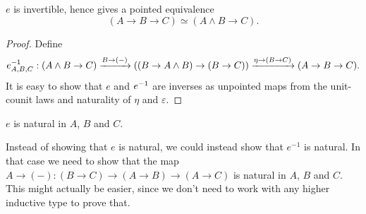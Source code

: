 \documentclass{article}
\newcommand{\pmap}{\to}
\newcommand{\lpmap}{\xrightarrow}
\renewcommand{\smash}{\wedge}
\renewcommand{\epsilon}{\varepsilon}
\renewcommand{\o}{\ensuremath{\circ}}
\begin{document}
\begin{lem}
  $e$ is invertible, hence gives a pointed equivalence $$(A\pmap B\pmap C)\simeq(A\smash B\pmap C).$$
\end{lem}
\begin{proof}
  Define
  $$\inv{e}_{A,B,C}:(A\smash B\pmap C)\lpmap{B\pmap({-})}((B\pmap A\smash B)\pmap (B\pmap
  C))\lpmap{\eta\pmap(B\pmap C)}(A\pmap B\pmap C).$$ It is easy to show that $e$ and ${e}^{-1}$ are
  inverses as unpointed maps from the unit-counit laws and naturality of $\eta$ and $\epsilon$.

\end{proof}
\begin{lem}\label{e-natural}
$e$ is natural in $A$, $B$ and $C$.
\end{lem}
\begin{rmk}
\item Instead of showing that $e$ is natural, we could instead show that $e^{-1}$ is natural. In
  that case we need to show that the map $A\to({-}):(B\to C)\to(A\to B)\to(A\to C)$ is natural in
  $A$, $B$ and $C$. This might actually be easier, since we don't need to work with any higher
  inductive type to prove that.
\end{rmk}
\end{document}
